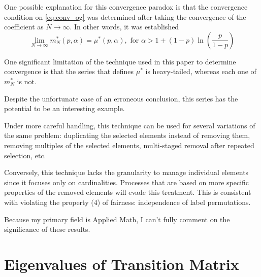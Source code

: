 \documentclass{article}
\newcommand{\ppar}[1]{\left( #1 \right)}
\begin{document}
One possible explanation for this convergence paradox is that the convergence condition on \eqref{eq:conv_og} was determined after taking the convergence of the coefficient as $N\rightarrow \infty$.
%
In other words, it was established
\begin{equation}
    \lim_{N \rightarrow \infty} m^*_N (p, \alpha) = \mu^*(p,\alpha), \text{ for }\alpha > 1 + \ppar{1-p} \ln{\ppar{\frac{p}{1-p}}} 
\end{equation}

One significant limitation of the technique used in this paper to determine convergence is that the series that defines $\mu^*$ is heavy-tailed, whereas each one of $m^*_N$ is not.

Despite the unfortunate case of an erroneous conclusion, this series has the potential to be an interesting example.

Under more careful handling, this technique can be used for several variations of the same problem: duplicating the selected elements instead of removing them, removing multiples of the selected elements, multi-staged removal after repeated selection, etc.

Conversely, this technique lacks the granularity to manage individual elements since it focuses only on cardinalities. 
%
Processes that are based on more specific properties of the removed elements will evade this treatment.
%
This is consistent with violating the property (4) of fairness: independence of label permutations.


Because my primary field is Applied Math, I can't fully comment on the significance of these results. 




\newpage

\appendix 

\section{Eigenvalues of Transition Matrix}
\label{ap:eigenvalues}
\end{document}
